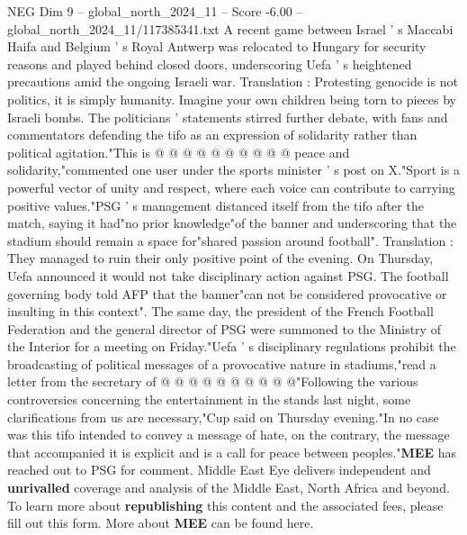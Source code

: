 \begin{textsample}{NEG Dim 9 – global\_north\_2024\_11 – Score -6.00 – global\_north\_2024\_11/117385341.txt}
A recent game between Israel ' s Maccabi Haifa and Belgium ' s Royal Antwerp was relocated to Hungary for security reasons and played behind closed doors, underscoring Uefa ' s heightened precautions amid the ongoing Israeli war.
Translation : Protesting genocide is not politics, it is simply humanity.
Imagine your own children being torn to pieces by Israeli bombs.
The politicians ' statements stirred further debate, with fans and commentators defending the tifo as an expression of solidarity rather than political agitation."This is @ @ @ @ @ @ @ @ @ @ peace and solidarity,"commented one user under the sports minister ' s post on X."Sport is a powerful vector of unity and respect, where each voice can contribute to carrying positive values."PSG ' s management distanced itself from the tifo after the match, saying it had"no prior knowledge"of the banner and underscoring that the stadium should remain a space for"shared passion around football".
Translation : They managed to ruin their only positive point of the evening.
On Thursday, Uefa announced it would not take disciplinary action against PSG.
The football governing body told AFP that the banner"can not be considered provocative or insulting in this context".
The same day, the president of the French Football Federation and the general director of PSG were summoned to the Ministry of the Interior for a meeting on Friday."Uefa ' s disciplinary regulations prohibit the broadcasting of political messages of a provocative nature in stadiums,"read a letter from the secretary of @ @ @ @ @ @ @ @ @ @"Following the various controversies concerning the entertainment in the stands last night, some clarifications from us are necessary,"Cup said on Thursday evening."In no case was this tifo intended to convey a message of hate, on the contrary, the message that accompanied it is explicit and is a call for peace between peoples."\textbf{MEE} has reached out to PSG for comment.
Middle East Eye delivers independent and \textbf{unrivalled} coverage and analysis of the Middle East, North Africa and beyond.
To learn more about \textbf{republishing} this content and the associated fees, please fill out this form.
More about \textbf{MEE} can be found here.

\end{textsample}
